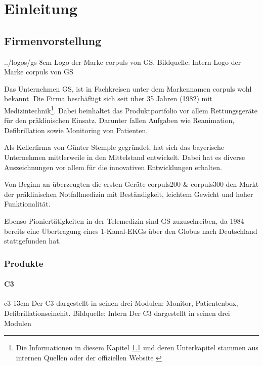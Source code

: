 \chapter{Einleitung}
\label{einleitung}
\minitoc\pagebreak


\section{Firmenvorstellung}
\label{sec:firma}
\bild
{../logos/gs}
{8cm}
{Logo der Marke \glqq corpuls\grqq{} von \acrlong*{GS}. Bildquelle: Intern}
{Logo der Marke \glqq corpuls\grqq{} von GS}

Das Unternehmen \gls{GS}, ist in Fachkreisen unter dem Markennamen \glqq corpuls\grqq{} wohl bekannt. 
Die Firma beschäftigt sich seit über 35 Jahren (1982) mit Medizintechnik\footnote{Die Informationen in diesem Kapitel \ref{sec:firma} und deren Unterkapitel stammen aus internen Quellen oder der offiziellen Website \cite{GSElektromedizinischeGerateG.StempleGmbH.}}.
Dabei beinhaltet das Produktportfolio vor allem Rettungsgeräte für den präklinischen Einsatz.
Darunter fallen Aufgaben wie Reanimation, Defibrillation sowie Monitoring von Patienten. 

Als Kellerfirma von Günter Stemple gegründet, hat sich das bayerische Unternehmen mittlerweile in den Mittelstand entwickelt.
Dabei hat es diverse Auszeichnungen vor allem für die innovativen Entwicklungen erhalten.

Von Beginn an überzeugten die ersten Geräte corpuls200 \& corpuls300 den Markt der präklinischen Notfallmedizin mit Beständigkeit, leichtem Gewicht und hoher Funktionalität. 

Ebenso Pioniertätigkeiten in der Telemedizin sind \gls{GS} zuzuschreiben, da 1984 bereits eine Übertragung eines 1-Kanal-\gls{EKG}s über den Globus nach Deutschland stattgefunden hat.


\subsection{Produkte}

\subsubsection{\acrlong*{C3}}
\bild
{c3}
{13cm}
{Der \acrlong{C3} dargestellt in seinen drei Modulen: Monitor, Patientenbox, Defibrillationseinehit. Bildquelle: Intern}
{Der \acrlong*{C3} dargestellt in seinen drei Modulen}

